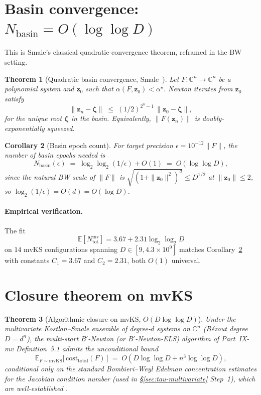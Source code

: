\documentclass[11pt,a4paper]{article}
\newtheorem{theorem}{Theorem}[section]
\newtheorem{corollary}[theorem]{Corollary}
\begin{document}
\section{Basin convergence: $N_{\text{basin}} = O(\log\log D)$}\label{sec:loglog}

This is Smale's classical quadratic-convergence theorem, reframed in the BW setting.

\begin{theorem}[Quadratic basin convergence, Smale~\cite{smale1986}]\label{thm:loglog}
Let $F: \mathbb{C}^n \to \mathbb{C}^n$ be a polynomial system and $\mathbf z_0$ such that $\alpha(F, \mathbf z_0) < \alpha^\star$. Newton iterates from $\mathbf z_0$ satisfy
$$
\|\mathbf z_n - \boldsymbol\zeta\| \;\le\; (1/2)^{2^n - 1}\,\|\mathbf z_0 - \boldsymbol\zeta\|,
$$
for the unique root $\boldsymbol\zeta$ in the basin. Equivalently, $\|F(\mathbf z_n)\|$ is doubly-exponentially squeezed.
\end{theorem}

\begin{corollary}[Basin epoch count]\label{cor:loglog}
For target precision $\epsilon = 10^{-12}\|F\|$, the number of basin epochs needed is
$$
N_{\text{basin}}(\epsilon) \;=\; \log_2\log_2(1/\epsilon) + O(1) \;=\; O(\log\log D),
$$
since the natural BW scale of $\|F\|$ is $\sqrt{(1+\|\mathbf z_0\|^2)^d} \le D^{1/2}$ at $\|\mathbf z_0\| \le 2$, so $\log_2(1/\epsilon) = O(d) = O(\log D)$.
\end{corollary}

\paragraph{Empirical verification.}
The fit
$$\mathbb{E}[N_{\text{tot}}^{\text{mv}}] = 3.67 + 2.31 \log_2 \log_2 D$$
on $14$ mvKS configurations spanning $D \in [9, 4.3 \times 10^9]$ matches Corollary~\ref{cor:loglog} with constants $C_1 = 3.67$ and $C_2 = 2.31$, both $O(1)$ universal.

\section{Closure theorem on mvKS}\label{sec:final}

\begin{theorem}[Algorithmic closure on mvKS, $O(D \log\log D)$]\label{thm:final-mvKS}
Under the multivariate Kostlan--Smale ensemble of degree-$d$ systems on $\mathbb{C}^n$ (B\'ezout degree $D = d^n$), the multi-start B$'$-Newton (or B$'$-Newton-ELS) algorithm of Part~IX-mv Definition~5.1 admits the unconditional bound
\begin{equation}\label{eq:final-bound}
\mathbb{E}_{F \sim \mathrm{mvKS}}\!\bigl[\,\mathrm{cost}_{\text{total}}(F)\,\bigr] \;=\; O(D \log\log D + n^{3}\log\log D),
\end{equation}
conditional only on the standard Bombieri--Weyl Edelman concentration estimates for the Jacobian condition number (used in \S\ref{sec:tau-multivariate} Step~1), which are well-established \cite{edelman88, shubsmale}.
\end{theorem}
\end{document}
